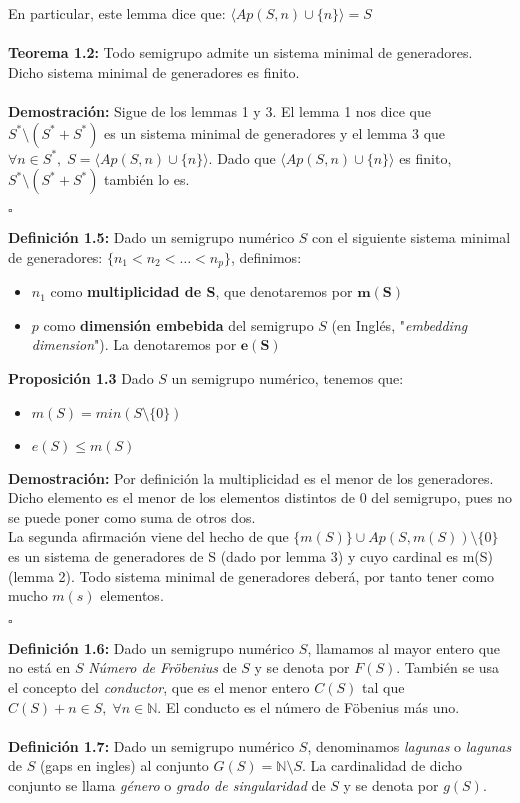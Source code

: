 \documentclass[11pt,spanish]{book}
\newcommand{\qed}{\begin{flushright} $\square$ \end{flushright}}
\begin{document}
En particular, este lemma dice que: $\langle Ap(S,n)\cup\{n\}\rangle =S$\\
\\ \textbf{Teorema 1.2: } Todo semigrupo admite un sistema minimal de generadores. Dicho sistema minimal de generadores es finito. \\
\\ \textbf{Demostración: } Sigue de los lemmas 1 y 3. El lemma 1 nos dice que $S^{*}\setminus (S^{*}+S^{*})$ es un sistema minimal de generadores y el lemma 3 que  $\forall n\in S^{*},\; S=\langle Ap(S,n)\cup\{n\}\rangle $. Dado que  $\langle Ap(S,n)\cup\{n\}\rangle $ es finito, $S^{*}\setminus (S^{*}+S^{*})$ también lo es.
\qed
\textbf{Definición 1.5:} Dado un semigrupo numérico $S$ con el siguiente sistema minimal de generadores: $\{n_{1}< n_{2}<\ldots<n_{p}\}$, definimos:
\begin{itemize}
	\item $n_{1}$ como \textbf{multiplicidad de S}, que denotaremos por $\mathbf{m(S)}$
	\item $p$ como \textbf{dimensión embebida} del semigrupo $S$ (en Inglés, "\textit{embedding dimension}"). La denotaremos por $\mathbf{e(S)}$
\end{itemize}
\textbf{Proposición 1.3} Dado $S$ un semigrupo numérico, tenemos que:
\begin{itemize}
	\item $m(S) = min(S\setminus \{0\})$
	\item $e(S)\leq m(S)$
\end{itemize} 
\textbf{Demostración:} Por definición la multiplicidad es el menor de los generadores. Dicho elemento es el menor de los elementos distintos de $0$ del semigrupo, pues no se puede poner como suma de otros dos. \\

La segunda afirmación viene del hecho de que $\{m(S)\}\cup Ap(S,m(S))\setminus\{0\}$ es un sistema de generadores de S (dado por lemma 3) y cuyo cardinal es m(S) (lemma 2). Todo sistema minimal de generadores deberá, por tanto tener como mucho $m(s)$ elementos.
\qed
\textbf{Definición 1.6:} Dado un semigrupo numérico $S$, llamamos al mayor entero que no está en $S$ \textit{Número de Fröbenius} de $S$ y se denota por $F(S)$. También se usa el concepto del \textit{conductor}, que es el menor entero $C(S)$ tal que $C(S)+n\in S,\;\forall n\in \mathbb{N}$. El conducto es el número de Föbenius más uno. \\
\\ \hypertarget{def1.7}{\textbf{Definición 1.7:}} Dado un semigrupo numérico $S$, denominamos \textit{lagunas} o \textit{lagunas} de $S$ (gaps en ingles) al conjunto $G(S)=\mathbb{N}\setminus S$. La cardinalidad de dicho conjunto se llama \textit{género} o \textit{grado de singularidad} de $S$ y se denota por $g(S)$.\\
\end{document}
